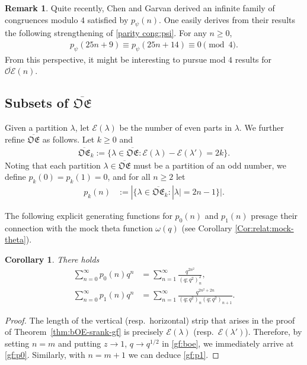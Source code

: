 \documentclass[12pt,reqno]{amsart}
\numberwithin{equation}{section}
\theoremstyle{plain}
\newtheorem{corollary}[theorem]{Corollary}
\theoremstyle{definition}
\newtheorem{remark}[theorem]{Remark}
\def\cE{\mathcal{E}}
\def\bOE{\overline{\mathcal{OE}}}
\def\bfOE{\overline{\mathfrak{OE}}}
\begin{document}
\begin{remark}
Quite recently, Chen and Garvan \cite[Eq. (4.31)]{CG22} derived an infinite family of congruences modulo $4$
satisfied by $p_\psi(n)$. One easily derives from their results the following strengthening of
\eqref{parity cong:psi}. For any $n\geq0$,
\begin{align*}
p_\psi(25n+9)\equiv p_\psi(25n+14)\equiv0\pmod{4}.
\end{align*}
From this perspective, it might be interesting to pursue mod $4$ results for $\bOE(n)$.
\end{remark}


\subsection{Subsets of \texorpdfstring{$\bfOE$}{overlined-OE}}\label{subsec:bfOE-refine}
Given a partition $\lambda$, let $\cE(\lambda)$ be the number of even parts in $\lambda$. We further refine
$\bfOE$ as follows. Let $k\ge 0$ and
\begin{align*}
\bfOE_{k}:=\{\lambda\in\bfOE: \cE(\lambda)-\cE(\lambda')=2k\}.
\end{align*}
Noting that each partition $\lambda\in\bfOE$ must be a partition of an odd number, we define $p_k(0)=p_k(1)=0$,
and for all $n\ge 2$ let
\begin{align*}
p_k(n)&:=|\{\lambda\in\bfOE_k:|\lambda|=2n-1\}|.
\end{align*}

The following explicit generating functions for $p_0(n)$ and $p_1(n)$ presage their connection with the mock
theta function $\omega(q)$ (see Corollary \ref{Cor:relat:mock-theta}).

\begin{corollary}
There holds
\begin{align}
\sum_{n=0}^\infty p_0(n)q^n &=\sum_{n=1}^{\infty}\frac{q^{2n^2}}{(q;q^2)_{n}^2},\label{gf:p0}\\
\sum_{n=0}^\infty p_1(n)q^n &=\sum_{n=1}^{\infty}\frac{q^{2n^2+2n}}{(q;q^2)_{n}(q;q^2)_{n+1}}.\label{gf:p1}
\end{align}
\end{corollary}

\begin{proof}
The length of the vertical (resp.~horizontal) strip that arises in the proof of Theorem~\ref{thm:bOE-srank-gf}
is precisely $\cE(\lambda)$ (resp.~$\cE(\lambda')$). Therefore, by setting $n=m$ and putting $z\to 1$,
$q\to q^{1/2}$ in \eqref{gf:boe}, we immediately arrive at \eqref{gf:p0}. Similarly, with $n=m+1$ we can
deduce \eqref{gf:p1}.
\end{proof}
\end{document}
